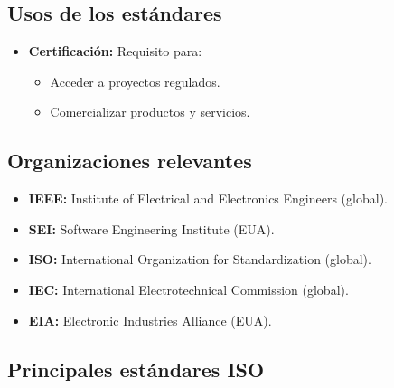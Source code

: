 \subsection{Usos de los estándares}\label{subsec:usos-de-los-estandares}
\begin{itemize}
    \item \textbf{Certificación:} Requisito para:
    \begin{itemize}
        \item Acceder a proyectos regulados.
        \item Comercializar productos y servicios.
    \end{itemize}
\end{itemize}

\subsection{Organizaciones relevantes}\label{subsec:organizaciones-relevantes}
\begin{itemize}
    \item \textbf{IEEE:} Institute of Electrical and Electronics Engineers (global).
    \item \textbf{SEI:} Software Engineering Institute (EUA).
    \item \textbf{ISO:} International Organization for Standardization (global).
    \item \textbf{IEC:} International Electrotechnical Commission (global).
    \item \textbf{EIA:} Electronic Industries Alliance (EUA).
\end{itemize}

\subsection{Principales estándares ISO}\label{subsec:principales-estandares-iso}


